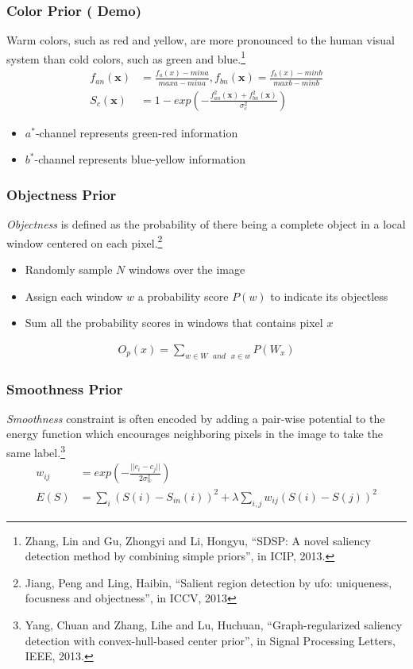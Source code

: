 \documentclass[notheorems,serif,table,compress]{beamer}  %
\begin{document}
\begin{frame}
\frametitle{{\color{magenta}} Color Prior (\color{yellow} \textbf{Demo})}
{\color{blue}Warm colors, such as red and yellow, are more pronounced to the human visual system than cold colors, such as green and blue.}\footnote{Zhang, Lin and Gu, Zhongyi and Li, Hongyu, ``SDSP: A novel saliency detection method by combining simple priors'', in ICIP, 2013.}
\begin{align}
f_{an}(\textbf{x}) & =\frac{f_a(x)-mina}{maxa-mina}, f_{bn}(\textbf{x}) = \frac{f_b(x)-minb}{maxb-minb}\\
S_c(\textbf{x}) & = 1-exp\left(-\frac{f_{an}^2(\textbf{x})+f_{bn}^2(\textbf{x})}{\sigma_c^2}\right)
\end{align}
\begin{itemize}
\item $a^*$-channel represents green-red information
\item $b^*$-channel represents blue-yellow information
\end{itemize}
\end{frame}


\begin{frame}
\frametitle{{\color{magenta}} Objectness Prior}
{\color{blue}\emph{Objectness}} is defined as the probability of there being a complete object in a local window centered on each pixel.\footnote{Jiang, Peng and Ling, Haibin, ``Salient region detection by ufo: uniqueness, focusness and objectness'', in ICCV, 2013} 
\begin{itemize}
\item Randomly sample $N$ windows over the image 
\item Assign each window $w$ a probability score $P(w)$ to indicate its objectless
\item Sum all the probability scores in windows that contains pixel $x$
\end{itemize}
\begin{align}
O_p(x) = \sum_{w \in W \text{ }and \text{ } x \in w} P(W_x)
\end{align}
\end{frame}


\begin{frame}
\frametitle{{\color{magenta}} Smoothness Prior}
{\color{blue}\emph{Smoothness}} constraint is often encoded by adding a pair-wise potential to the energy function which encourages neighboring pixels in the image to take the same label.\footnote{Yang, Chuan and Zhang, Lihe and Lu, Huchuan, ``Graph-regularized saliency detection with convex-hull-based center prior'', in Signal Processing Letters, IEEE, 2013.}
\begin{align}
w_{ij} & = exp\left(-\frac{||c_i-c_j||}{2\sigma_w^2}\right)\\
E(S) & = \sum_{i}(S(i)-S_{in}(i))^2+\lambda \sum_{i, j}w_{ij}(S(i)-S(j))^2
\end{align}
\end{frame}
\end{document}

